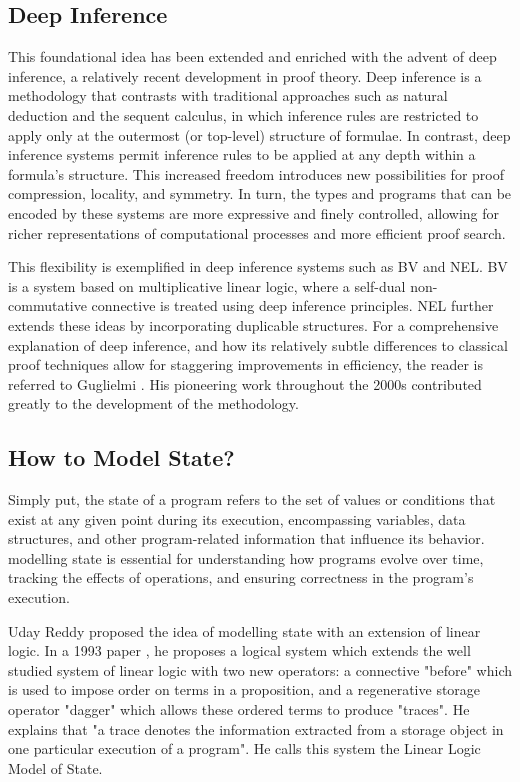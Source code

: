 \documentclass[11pt, oneside]{article}
\theoremstyle{plain}
\theoremstyle{definition}
\begin{document}
\subsection{Deep Inference}
This foundational idea has been extended and enriched with the advent of deep inference, a relatively recent development in proof theory.
Deep inference is a methodology that contrasts with traditional approaches such as natural deduction and the sequent calculus, in which inference rules are restricted to apply only at the outermost (or top-level) structure of formulae.
In contrast, deep inference systems permit inference rules to be applied at any depth within a formula's structure.
This increased freedom introduces new possibilities for proof compression, locality, and symmetry.
In turn, the types and programs that can be encoded by these systems are more expressive and finely controlled, allowing for richer representations of computational processes and more efficient proof search.

This flexibility is exemplified in deep inference systems such as BV and NEL.
BV \cite{bruscoli2002purely} is a system based on multiplicative linear logic, where a self-dual non-commutative connective is treated using deep inference principles.
NEL \cite{guglielmi2002non} further extends these ideas by incorporating duplicable structures.
For a comprehensive explanation of deep inference, and how its relatively subtle differences to classical proof techniques allow for staggering improvements in efficiency, the reader is referred to Guglielmi \cite{guglielmi2015deep}.
His pioneering work throughout the 2000s contributed greatly to the development of the methodology.

\subsection{How to Model State?}
Simply put, the state of a program refers to the set of values or conditions that exist at any given point during its execution, encompassing variables, data structures, and other program-related information that influence its behavior.
modelling state is essential for understanding how programs evolve over time, tracking the effects of operations, and ensuring correctness in the program's execution.

Uday Reddy proposed the idea of modelling state with an extension of linear logic.
In a 1993 paper \cite{reddy1993all}, he proposes a logical system which extends the well studied system of linear logic with two new operators:
a connective "before" which is used to impose order on terms in a proposition, and a regenerative storage operator "dagger" which allows these ordered terms to produce "traces".
He explains that "a trace denotes the information extracted from a storage object in one particular execution of a program".
He calls this system the Linear Logic Model of State.
\end{document}
